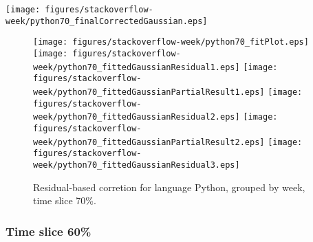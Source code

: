 \begin{center}
{\texttt{[image: figures/stackoverflow-week/python70\_finalCorrectedGaussian.eps]}}
\end{center}

\FloatBarrier

\begin{figure}[t]
\centering
{}
{\texttt{[image: figures/stackoverflow-week/python70\_fitPlot.eps]}}
{\texttt{[image: figures/stackoverflow-week/python70\_fittedGaussianResidual1.eps]}}
{\texttt{[image: figures/stackoverflow-week/python70\_fittedGaussianPartialResult1.eps]}}
{\texttt{[image: figures/stackoverflow-week/python70\_fittedGaussianResidual2.eps]}}
{\texttt{[image: figures/stackoverflow-week/python70\_fittedGaussianPartialResult2.eps]}}
{\texttt{[image: figures/stackoverflow-week/python70\_fittedGaussianResidual3.eps]}}
\caption{Residual-based corretion for language Python, grouped by week, time slice 70\%.}
\end{figure}


\FloatBarrier


\subsubsection{Time slice 60\%}

